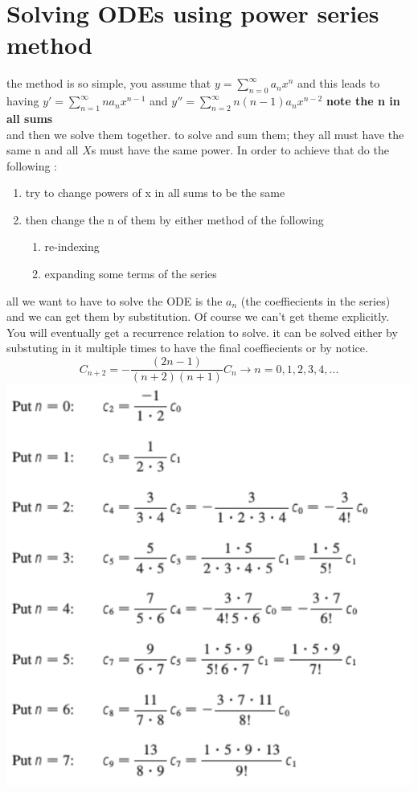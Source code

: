 \documentclass[11pt]{article}
\theoremstyle{definition}
\begin{document}
\section{Solving ODEs using power series method}
the method is so simple, you assume that $y = \sum_{n=0}^{\infty} a_nx^n$ and this leads to having $y' = \sum_{n=1}^{\infty} na_nx^{n-1}$ and $y'' = \sum_{n=2}^{\infty} n(n-1)a_nx^{n-2}$ \textbf{note the n in all sums}
\\ and then we solve them together. to solve and sum them; they all must have the same n and all $X$s must have the same power. In order to achieve that do the following :
\begin{enumerate}

\item try to change powers of x in all sums to be the same
\item then change the n of them by either method of the following
	\begin{enumerate}
	
	\item re-indexing
	\item expanding some terms of the series
	
	\end{enumerate}

\end{enumerate}
all we want to have to solve the ODE is the $a_n$ (the coeffiecients in the series) and we can get them by substitution. Of course we can't get theme explicitly. You will eventually get a recurrence relation to solve. it can be solved either by substuting in it multiple times to have the final coeffiecients or by notice. 
\begin{equation}
	C_{n+2} = - \frac{(2n-1)}{(n+2)(n+1)} C_n \to  n = 0,1,2,3,4,...
\end{equation}
\includegraphics[scale=0.5]{images/img2.png}
\end{document}

